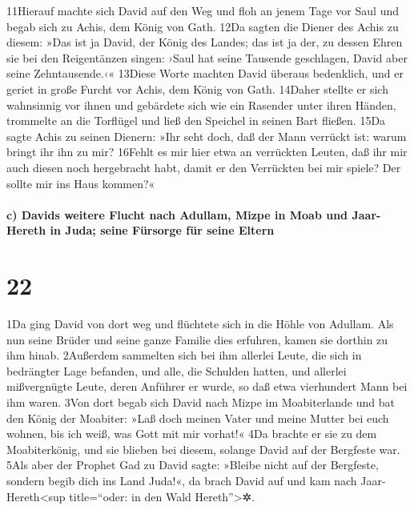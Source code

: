11Hierauf machte sich David auf den Weg und floh an jenem Tage vor Saul
und begab sich zu Achis, dem König von Gath. 12Da sagten die Diener des
Achis zu diesem: »Das ist ja David, der König des Landes; das ist ja
der, zu dessen Ehren sie bei den Reigentänzen singen: ›Saul hat seine
Tausende geschlagen, David aber seine Zehntausende.‹« 13Diese Worte
machten David überaus bedenklich, und er geriet in große Furcht vor
Achis, dem König von Gath. 14Daher stellte er sich wahnsinnig vor ihnen
und gebärdete sich wie ein Rasender unter ihren Händen, trommelte an die
Torflügel und ließ den Speichel in seinen Bart fließen. 15Da sagte Achis
zu seinen Dienern: »Ihr seht doch, daß der Mann verrückt ist: warum
bringt ihr ihn zu mir? 16Fehlt es mir hier etwa an verrückten Leuten,
daß ihr mir auch diesen noch hergebracht habt, damit er den Verrückten
bei mir spiele? Der sollte mir ins Haus kommen?«

\hypertarget{c-davids-weitere-flucht-nach-adullam-mizpe-in-moab-und-jaar-hereth-in-juda-seine-fuxfcrsorge-fuxfcr-seine-eltern}{%
\paragraph{c) Davids weitere Flucht nach Adullam, Mizpe in Moab und
Jaar-Hereth in Juda; seine Fürsorge für seine
Eltern}\label{c-davids-weitere-flucht-nach-adullam-mizpe-in-moab-und-jaar-hereth-in-juda-seine-fuxfcrsorge-fuxfcr-seine-eltern}}

\hypertarget{section-21}{%
\section{22}\label{section-21}}

1Da ging David von dort weg und flüchtete sich in die Höhle von Adullam.
Als nun seine Brüder und seine ganze Familie dies erfuhren, kamen sie
dorthin zu ihm hinab. 2Außerdem sammelten sich bei ihm allerlei Leute,
die sich in bedrängter Lage befanden, und alle, die Schulden hatten, und
allerlei mißvergnügte Leute, deren Anführer er wurde, so daß etwa
vierhundert Mann bei ihm waren. 3Von dort begab sich David nach Mizpe im
Moabiterlande und bat den König der Moabiter: »Laß doch meinen Vater und
meine Mutter bei euch wohnen, bis ich weiß, was Gott mit mir vorhat!«
4Da brachte er sie zu dem Moabiterkönig, und sie blieben bei diesem,
solange David auf der Bergfeste war. 5Als aber der Prophet Gad zu David
sagte: »Bleibe nicht auf der Bergfeste, sondern begib dich ins Land
Juda!«, da brach David auf und kam nach Jaar-Hereth\textless sup
title=``oder: in den Wald Hereth''\textgreater✲.

